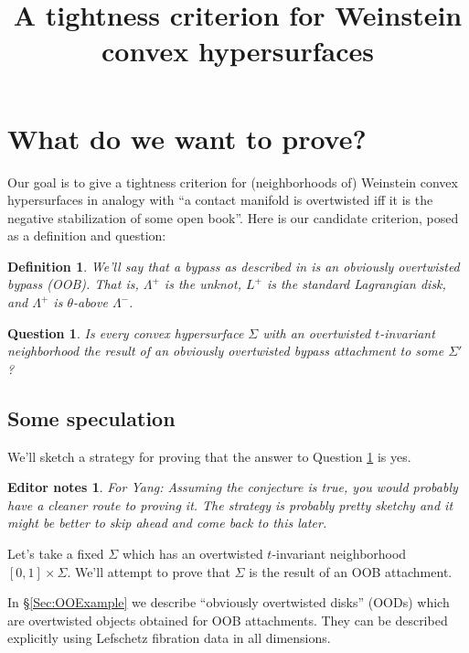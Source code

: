 \documentclass[11pt]{amsart}
\title[Weinstein convex hypersurfaces]{A tightness criterion for Weinstein convex hypersurfaces}
\newcommand{\Leg}{\Lambda}
\newcommand{\Lag}{L}
\newcommand{\posLag}{\Lag^{+}}
\newcommand{\posLeg}{\Leg^{+}}
\newcommand{\negLeg}{\Leg^{-}}
\newtheorem{defn}[thm]{Definition}
\newtheorem{q}[thm]{Question}
\newtheorem{edits}[thm]{Editor notes}
\begin{document}
\maketitle

\section{What do we want to prove?}

Our goal is to give a tightness criterion for (neighborhoods of) Weinstein convex hypersurfaces \cite{HH:Convex} in analogy with ``a contact manifold is overtwisted iff it is the negative stabilization of some open book''. Here is our candidate criterion, posed as a definition and question:

\begin{defn}\label{Def:OOB}
We'll say that a bypass as described in \cite[\S 10]{HH:Bypass} is an \emph{obviously overtwisted bypass} (OOB). That is, $\posLeg$ is the unknot, $\posLag$ is the standard Lagrangian disk, and $\posLeg$ is $\theta$-above $\negLeg$.
\end{defn}

\begin{q}\label{Q:OTCriterion}
Is every convex hypersurface $\Sigma$ with an overtwisted $t$-invariant neighborhood the result of an obviously overtwisted bypass attachment to some $\Sigma'$?
\end{q}

\subsection{Some speculation}

We'll sketch a strategy for proving that the answer to Question \ref{Q:OTCriterion} is yes.

\begin{edits}
For Yang: Assuming the conjecture is true, you would probably have a cleaner route to proving it. The strategy is probably pretty sketchy and it might be better to skip ahead and come back to this later.
\end{edits}

Let's take a fixed $\Sigma$ which has an overtwisted $t$-invariant neighborhood $[0, 1] \times \Sigma$. We'll attempt to prove that $\Sigma$ is the result of an OOB attachment.

In \S \ref{Sec:OOExample} we describe ``obviously overtwisted disks'' (OODs) which are overtwisted objects obtained for OOB attachments. They can be described explicitly using Lefschetz fibration data in all dimensions.
\end{document}
